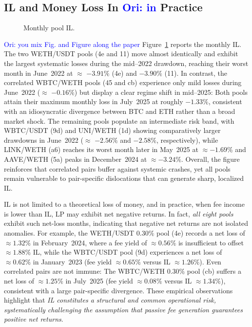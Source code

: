 \documentclass[journal]{IEEEtran}
\newcommand{\ori}[1]{\textcolor{blue}{Ori: #1}}
\begin{document}
\subsection{IL and Money Loss In \ori{in} Practice}

\begin{figure}[ht]
  \centering
    \resizebox{0.5\textwidth}{!}{%
        
    }
  \caption{Monthly pool IL.}
  \label{fig:monthly_il}
\end{figure}

\ori{you mix Fig. and Figure along the paper}
Figure~\ref{fig:monthly_il} reports the monthly IL. The two WETH/USDT pools (4e and 11) move almost identically and exhibit the largest systematic losses during the mid--2022 drawdown, reaching their worst month in June~2022 at $\approx$ $-3.91\%$ (4e) and $-3.90\%$ (11). In contrast, the correlated WBTC/WETH pools (45 and cb) experience only mild losses during June~2022 ($\approx$ $-0.16\%$) but display a clear regime shift in mid--2025: Both pools attain their maximum monthly loss in July~2025 at roughly $-1.33\%$, consistent with an idiosyncratic divergence between BTC and ETH rather than a broad market shock. The remaining pools populate an intermediate risk band, with WBTC/USDT (9d) and UNI/WETH (1d) showing comparatively larger drawdowns in June~2022 ($\approx$ $-2.56\%$ and $-2.58\%$, respectively), while LINK/WETH (a6) reaches its worst month later in May~2025 at $\approx-1.69\%$ and AAVE/WETH (5a) peaks in December~2024 at $\approx-3.24\%$. Overall, the figure reinforces that correlated pairs buffer against systemic crashes, yet all pools remain vulnerable to pair-specific dislocations that can generate sharp, localized IL.


IL is not limited to a theoretical loss of money, and in practice, when fee income is lower than IL, LP may exhibit net negative returns. In fact, \emph{all eight pools} exhibit such net-loss months, indicating that negative net returns are not isolated anomalies. For example, the WETH/USDT 0.30\% pool (4e) records a net loss of $\approx1.32\%$ in February~2024, where a fee yield of $\approx0.56\%$ is insufficient to offset $\approx1.88\%$ IL, while the WBTC/USDT pool (9d) experiences a net loss of $\approx0.62\%$ in January~2023 (fee yield $\approx0.65\%$ versus IL $\approx1.26\%$). Even correlated pairs are not immune: The WBTC/WETH 0.30\% pool (cb) suffers a net loss of $\approx1.25\%$ in July~2025 (fee yield $\approx0.08\%$ versus IL $\approx1.34\%$), consistent with a large pair-specific divergence.
These empirical observations highlight that \textit{IL  constitutes a structural and common operational risk, systematically challenging the assumption that passive fee generation guarantees positive net returns}.
\end{document}
